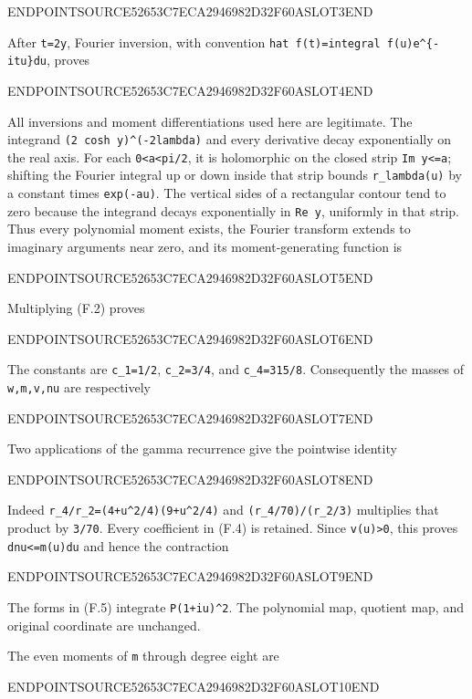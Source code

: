 ENDPOINTSOURCE52653C7ECA2946982D32F60ASLOT3END

After \texttt{t=2y}, Fourier inversion, with convention \texttt{hat\ f(t)=integral\ f(u)e\^{}\{-itu\}du}, proves

ENDPOINTSOURCE52653C7ECA2946982D32F60ASLOT4END

All inversions and moment differentiations used here are legitimate. The integrand \texttt{(2\ cosh\ y)\^{}(-2lambda)} and every derivative decay exponentially on the real axis. For each \texttt{0\textless{}a\textless{}pi/2}, it is holomorphic on the closed strip \texttt{\textbar{}Im\ y\textbar{}\textless{}=a}; shifting the Fourier integral up or down inside that strip bounds \texttt{r\_lambda(u)} by a constant times \texttt{exp(-a\textbar{}u\textbar{})}. The vertical sides of a rectangular contour tend to zero because the integrand decays exponentially in \texttt{\textbar{}Re\ y\textbar{}}, uniformly in that strip. Thus every polynomial moment exists, the Fourier transform extends to imaginary arguments near zero, and its moment-generating function is

ENDPOINTSOURCE52653C7ECA2946982D32F60ASLOT5END

Multiplying (F.2) proves

ENDPOINTSOURCE52653C7ECA2946982D32F60ASLOT6END

The constants are \texttt{c\_1=1/2}, \texttt{c\_2=3/4}, and \texttt{c\_4=315/8}. Consequently the masses of \texttt{w,m,v,nu} are respectively

ENDPOINTSOURCE52653C7ECA2946982D32F60ASLOT7END

Two applications of the gamma recurrence give the pointwise identity

ENDPOINTSOURCE52653C7ECA2946982D32F60ASLOT8END

Indeed \texttt{r\_4/r\_2=(4+u\^{}2/4)(9+u\^{}2/4)} and \texttt{(r\_4/70)/(r\_2/3)} multiplies that product by \texttt{3/70}. Every coefficient in (F.4) is retained. Since \texttt{v(u)\textgreater{}0}, this proves \texttt{dnu\textless{}=m(u)du} and hence the contraction

ENDPOINTSOURCE52653C7ECA2946982D32F60ASLOT9END

The forms in (F.5) integrate \texttt{\textbar{}P(1+iu)\textbar{}\^{}2}. The polynomial map, quotient map, and original coordinate are unchanged.

The even moments of \texttt{m} through degree eight are

ENDPOINTSOURCE52653C7ECA2946982D32F60ASLOT10END

